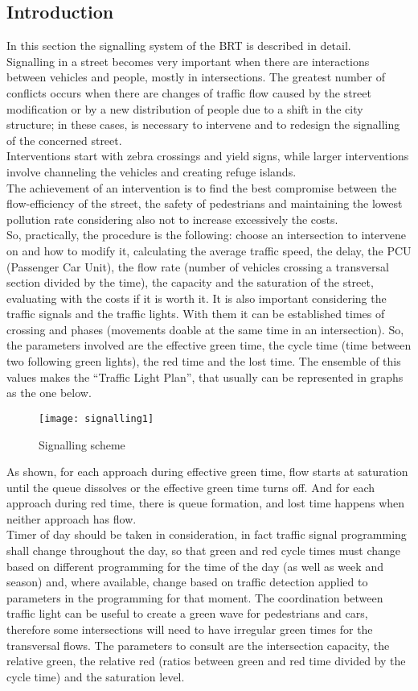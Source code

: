 \documentclass{article}
\begin{document}
\subsection{Introduction}
In this section the signalling system of the BRT is described in detail.\cite{signalling}\\
Signalling in a street becomes very important when there are interactions between vehicles and people, mostly in intersections. The greatest number of conflicts occurs when there are changes of traffic flow caused by the street modification or by a new distribution of people due to a shift in the city structure; in these cases, is necessary  to intervene and to redesign the signalling of the concerned street.\\
Interventions start with zebra crossings and yield signs, while larger interventions involve channeling the vehicles and creating refuge islands.\\
The achievement of an intervention is to find the best compromise between the flow-efficiency of the street, the safety of pedestrians and maintaining the lowest pollution rate considering also not to increase excessively the costs.\\
So, practically, the procedure is the following: choose an intersection to intervene on and how to modify it, calculating the average traffic speed, the delay, the PCU (Passenger Car Unit), the flow rate (number of vehicles crossing a transversal section divided by the time), the capacity and the saturation of the street, evaluating with the costs if it is worth it. 
It is also important considering the traffic signals and the traffic lights. With them it can be established times of crossing and phases (movements doable at the same time in an intersection). So, the parameters involved are the effective green time, the cycle time (time between two following green lights), the red time and the lost time. The ensemble of this values makes the “Traffic Light Plan”, that usually can be represented in graphs as the one below.
\begin{figure}[H]
\centering
\texttt{[image: signalling1]}
\caption{Signalling scheme}
\end{figure}
As shown, for each approach during effective green time, flow starts at saturation until the queue dissolves or the effective green time turns off. And for each approach during red time, there is queue formation, and lost time happens when neither approach has flow.\\
Timer of day should be taken in consideration, in fact traffic signal programming shall change throughout the day, so that green and red cycle times must change based on different programming for the time of the day (as well as week and season) and, where available, change based on traffic detection applied to parameters in the programming for that moment. 
The coordination between traffic light can be useful to create a green wave for pedestrians and cars, therefore some intersections will need to have irregular green times for the transversal flows. 
The parameters to consult are the intersection capacity, the relative green, the relative red (ratios between green and red time divided by the cycle time) and the saturation level. 
\end{document}
